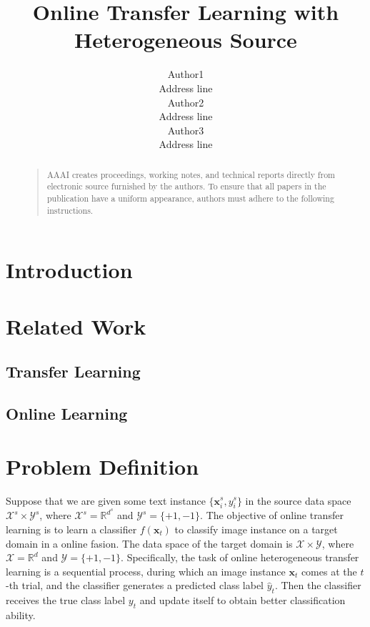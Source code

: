 \documentclass[letterpaper]{article}
\begin{document}
%
\title{Online Transfer Learning with Heterogeneous Source}
\author{Author1\\ Address line\\
\And Author2 \\ Address line\\
\And Author3 \\ Address line\\
}
\maketitle
\begin{abstract}
\begin{quote}
AAAI creates proceedings, working notes, and technical reports directly from electronic source furnished by the authors. To ensure that all papers in the publication have a uniform appearance, authors must adhere to the following instructions. 
\end{quote}
\end{abstract}


\section{Introduction}

\section{Related Work}

\subsection{Transfer Learning}

\subsection{Online Learning}

\section{Problem Definition}

Suppose that we are given some text instance $\{\mathbf{x}_{i}^{s}, y_{i}^{s}\}$ in the source data space $\mathcal{X}^{s} \times \mathcal{Y}^{s}$, where $\mathcal{X}^{s} = \mathbb{R}^{d^s}$ and $\mathcal{Y}^{s} = \{+1,-1\}$.
The objective of online transfer learning is to learn a classifier $f(\mathbf{x}_{t})$ to classify image instance on a target domain in a online fasion.
The data space of the target domain is $\mathcal{X} \times \mathcal{Y}$, where $\mathcal{X} = \mathbb{R}^{d}$ and $\mathcal{Y} = \{+1,-1\}$.
Specifically, the task of online heterogeneous transfer learning is a sequential process, during which an image instance $\mathbf{x}_t$ comes at the $t$-th trial, and the classifier generates a predicted class label $\hat{y}_{t}$.
Then the classifier receives the true class label $y_t$ and update itself to obtain better classification ability.
\end{document}
